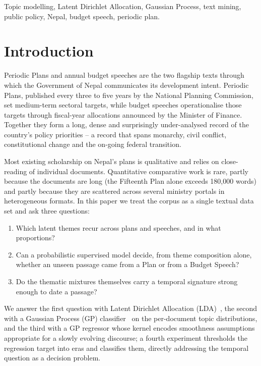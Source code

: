 \documentclass[conference]{IEEEtran}
\begin{document}
\begin{IEEEkeywords}
Topic modelling, Latent Dirichlet Allocation, Gaussian Process,
text mining, public policy, Nepal, budget speech, periodic plan.
\end{IEEEkeywords}

\section{Introduction}
Periodic Plans and annual budget speeches are the two flagship texts
through which the Government of Nepal communicates its development
intent.  Periodic Plans, published every three to five years by the
National Planning Commission, set medium-term sectoral targets, while
budget speeches operationalise those targets through fiscal-year
allocations announced by the Minister of Finance.  Together they form
a long, dense and surprisingly under-analysed record of the country's
policy priorities -- a record that spans monarchy, civil conflict,
constitutional change and the on-going federal transition.

Most existing scholarship on Nepal's plans is qualitative and relies
on close-reading of individual documents.  Quantitative comparative
work is rare, partly because the documents are long (the
Fifteenth Plan alone exceeds 180{,}000 words) and partly because they
are scattered across several ministry portals in heterogeneous
formats.  In this paper we treat the corpus as a single textual data
set and ask three questions:

\begin{enumerate}
\item Which latent themes recur across plans and speeches, and in what
      proportions?
\item Can a probabilistic supervised model decide, from theme
      composition alone, whether an unseen passage came from a Plan or
      from a Budget Speech?
\item Do the thematic mixtures themselves carry a temporal signature
      strong enough to date a passage?
\end{enumerate}

We answer the first question with Latent Dirichlet Allocation
(LDA)~\cite{blei2003latent}, the second with a Gaussian Process (GP)
classifier~\cite{rasmussen2006gaussian} on the per-document topic
distributions, and the third with a GP regressor whose kernel encodes
smoothness assumptions appropriate for a slowly evolving discourse; a
fourth experiment thresholds the regression target into eras and
classifies them, directly addressing the temporal question as a
decision problem.
\end{document}
